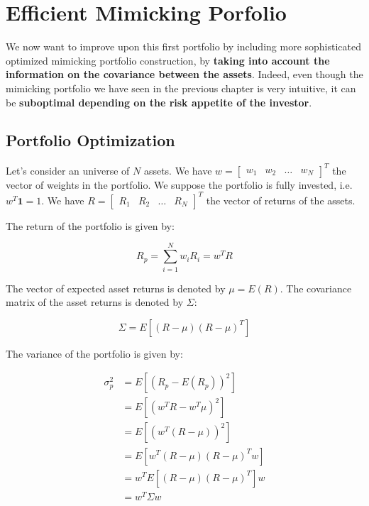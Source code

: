 \chapter{Efficient Mimicking Porfolio}
 
We now want to improve upon this first portfolio 
by including more sophisticated optimized mimicking 
portfolio construction, by \textbf{taking into account 
the information on the covariance between the 
assets}. Indeed, even though the mimicking portfolio we have 
seen in the previous chapter is very intuitive, 
it can be \textbf{suboptimal depending on the 
risk appetite of the investor}.

\section{Portfolio Optimization}

Let's consider an universe of $N$ assets. 
We have $w = \begin{bmatrix}
    w_1 & w_2 & \ldots & w_N
\end{bmatrix}^T$ the vector of weights in the
portfolio.
We suppose the portfolio is fully invested, i.e.
$w^T \mathbf{1} = 1$.
We have $R = \begin{bmatrix}
    R_1 & R_2 & \ldots & R_N
\end{bmatrix}^T$ the vector of returns of the assets.

The return of the portfolio is given by:

\begin{equation}
    R_p = \sum^N_{i=1} w_i R_i = w^T R
\end{equation}

The vector of expected asset returns is denoted by $\mu = E(R)$.
The covariance matrix of the asset returns is denoted by $\Sigma$:

\begin{equation}
    \Sigma = E[(R - \mu)(R - \mu)^T]
\end{equation}

The variance of the portfolio is given by:

\begin{equation}
    \begin{aligned}
        \sigma^2_p &= E[(R_p - E(R_p))^2] \\
        &= E[(w^T R - w^T \mu)^2] \\
        &= E[(w^T (R - \mu))^2] \\
        &= E[w^T (R - \mu)(R - \mu)^T w] \\
        &= w^T E[(R - \mu)(R - \mu)^T] w \\
        &= w^T \Sigma w
    \end{aligned}
\end{equation}

